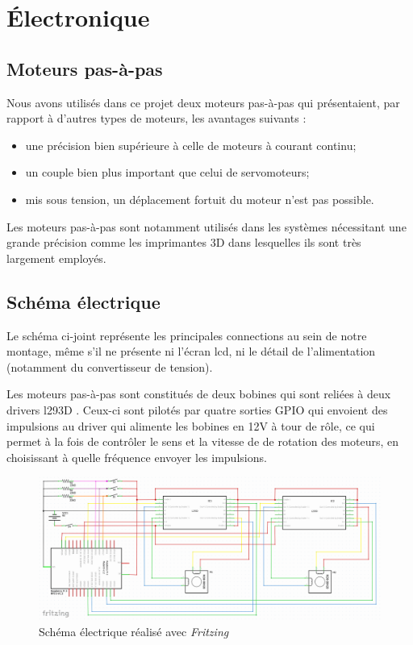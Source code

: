 \documentclass[12pt,a4paper]{report}
\begin{document}
	\chapter{Électronique}
\section{Moteurs pas-à-pas}
Nous avons utilisés dans ce projet deux moteurs pas-à-pas qui présentaient, par rapport à d'autres types de moteurs, les avantages suivants : 
\begin{itemize}[label=--]
\item une précision bien supérieure à celle de moteurs à courant continu;
\item un couple bien plus important que celui de servomoteurs;
\item mis sous tension, un déplacement fortuit du moteur n'est pas possible.
\end{itemize}
Les moteurs pas-à-pas sont notamment utilisés dans les systèmes nécessitant une grande précision comme les imprimantes 3D dans lesquelles ils sont très largement employés.

\section{Schéma électrique}
Le schéma ci-joint représente les principales connections au sein de notre montage, même s'il ne présente ni l'écran lcd, ni le détail de l'alimentation (notamment du convertisseur de tension).

Les moteurs pas-à-pas sont constitués de deux bobines qui sont reliées à deux drivers l293D . Ceux-ci sont pilotés par quatre sorties GPIO qui envoient des impulsions au driver qui alimente les bobines en 12V à tour de rôle, ce qui permet à la fois de contrôler le sens et la vitesse de de rotation des moteurs, en choisissant à quelle fréquence envoyer les impulsions.
\begin{figure}[!h]
 \center
 \includegraphics[scale=0.34]{../pictures/Sudoku_schema_electrique.png}
 \caption{Schéma électrique réalisé avec \emph{Fritzing}}
\end{figure}
\end{document}
